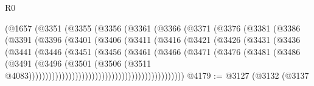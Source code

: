 \begin{lexlean}{R0}
\begin{coremodule}
                            (@1657
                              (@3351
                                (@3355
                                  (@3356
                                    (@3361
                                      (@3366
                                        (@3371
                                          (@3376
                                            (@3381
                                              (@3386
                                                (@3391
                                                  (@3396
                                                    (@3401
                                                      (@3406
                                                        (@3411
                                                          (@3416
                                                            (@3421
                                                              (@3426
                                                                (@3431
                                                                  (@3436
                                                                    (@3441
                                                                      (@3446
                                                                        (@3451
                                                                          (@3456
                                                                            (@3461
                                                                              (@3466
                                                                                (@3471
                                                                                  (@3476
                                                                                    (@3481
                                                                                      (@3486
                                                                                        (@3491
                                                                                          (@3496
                                                                                            (@3501
                                                                                              (@3506
                                                                                                (@3511
                                                                                                  @4083)))))))))))))))))))))))))))))))))))))))))))))))
@4179 := @3127
    (@3132
      (@3137

\end{coremodule}
\end{lexlean}
